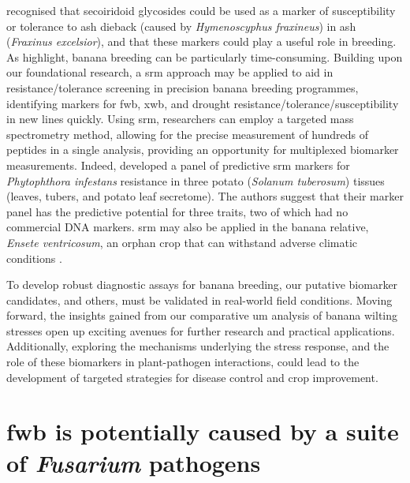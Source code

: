 \textcite{Sambles2017, Sidda2020} recognised that secoiridoid glycosides could be used as a marker of susceptibility or tolerance to ash dieback (caused by \textit{Hymenoscyphus fraxineus}) in ash (\textit{Fraxinus excelsior}), and that these markers could play a useful role in breeding. As \textcite{Nansamba2020, Kumar2020} highlight, banana breeding can be particularly time-consuming. Building upon our foundational research, a \ac{srm} approach may be applied to aid in resistance/tolerance screening in precision banana breeding programmes, identifying markers for \ac{fwb}, \ac{xwb}, and drought resistance/tolerance/susceptibility in new lines quickly. Using \ac{srm}, researchers can employ a targeted mass spectrometry method, allowing for the precise measurement of hundreds of peptides in a single analysis, providing an opportunity for multiplexed biomarker measurements. Indeed, \textcite{Chawade2016} developed a panel of predictive \ac{srm} markers for \textit{Phytophthora infestans} resistance in three potato (\textit{Solanum tuberosum}) tissues (leaves, tubers, and potato leaf secretome). The authors suggest that their marker panel has the predictive potential for three traits, two of which had no commercial DNA markers. \Ac{srm} may also be applied in the banana relative, \textit{Ensete ventricosum}, an orphan crop that can withstand adverse climatic conditions \parencite{Feyisa2022}.

To develop robust diagnostic assays for banana breeding, our putative biomarker candidates, and others, must be validated in real-world field conditions. Moving forward, the insights gained from our comparative \ac{um} analysis of banana wilting stresses open up exciting avenues for further research and practical applications. Additionally, exploring the mechanisms underlying the stress response, and the role of these biomarkers in plant-pathogen interactions, could lead to the development of targeted strategies for disease control and crop improvement.

\section{\Acl{fwb} is potentially caused by a suite of \textit{Fusarium} pathogens}

